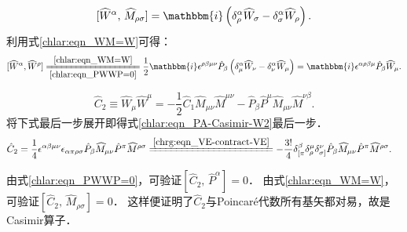 \begin{equation}\label{chlar:eqn_WM=W}
	[\widehat{W}^\alpha,\, \widehat{M}_{\rho \sigma} ] =  \mathbbm{i} 
	\left(\delta^\alpha_\rho \widehat{W}_\sigma-\delta^\alpha_\sigma \widehat{W}_\rho  \right).
\end{equation}
利用式\eqref{chlar:eqn_WM=W}可得：
\begin{equation}\label{chlar:eqn_WW=PW}
	[\widehat{W}^\alpha, \widehat{W}^\rho] 
	\xlongequal[\ref{chlar:eqn_PWWP=0}]{\ref{chlar:eqn_WM=W}}
	\frac{1}{2}\mathbbm{i} \epsilon^{\rho \beta\mu\nu} \hat{P}_\beta 
	\left(\delta^\alpha_\mu \widehat{W}_\nu - \delta^\alpha_\nu \widehat{W}_\mu\right)
	=\mathbbm{i} \epsilon^{\alpha \rho \beta \mu }  \hat{P}_\beta \widehat{W}_\mu   .
\end{equation}


\begin{equation}\label{chlar:eqn_PA-Casimir-W2}
	\hat{C}_2 \equiv \widehat{W}_\mu \widehat{W}^\mu 
	= -\frac{1}{2} \hat{C}_1 \widehat{M}_{\mu\nu}  \widehat{M}^{\mu\nu}
	- \hat{P}_\beta \hat{P}^\mu \widehat{M}_{\mu\nu}  \widehat{M}^{\nu\beta} .
\end{equation}
将下式最后一步展开即得式\eqref{chlar:eqn_PA-Casimir-W2}最后一步．
\begin{align*}
	\hat{C}_2 &= \frac{1}{4}
	\epsilon^{\alpha\beta\mu\nu} \epsilon_{\alpha\pi\rho\sigma}
	\hat{P}_\beta \widehat{M}_{\mu\nu}  \hat{P}^\pi \widehat{M}^{\rho\sigma}
	\xlongequal{\ref{chrg:eqn_VE-contract-VE}}
	-\frac{3!}{4}\delta^{\beta} _{[\pi}\delta^{\mu} _{\rho}\delta^{\nu} _{\sigma]}
	\hat{P}_\beta \widehat{M}_{\mu\nu}  \hat{P}^\pi \widehat{M}^{\rho\sigma}. 
\end{align*}


由式\eqref{chlar:eqn_PWWP=0}，可验证$[\hat{C}_2,\, \hat{P}^\alpha]=0$．
由式\eqref{chlar:eqn_WM=W}，可验证$[\hat{C}_2,\, \widehat{M}_{\rho\sigma}]=0$．
这样便证明了$\hat{C}_2$与Poincar\'e代数所有基矢都对易，故是Casimir算子．


